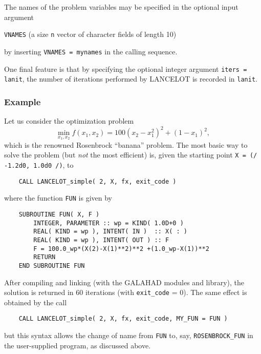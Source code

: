 \documentclass{article}
\begin{document}
The names of the problem variables may be specified in the optional
input argument
\begin{description}
\item[{\tt VNAMES} (a size {\tt n} vector of character fields of
length 10)]\mbox{}
\end{description}
by inserting {\tt VNAMES = mynames} in the calling sequence.

One final feature is that by specifying the optional integer
argument {\tt iters = lanit}, the number of iterations performed
by {\sf LANCELOT} is recorded in {\tt lanit}.

\subsubsection*{Example}

Let us consider the optimization problem
\[
\min_{x_1,x_2 } f( x_1, x_2 ) = 100 ( x_2 - x_1^2 )^2 + ( 1 - x_1 )^2,
\]
which is the renowned Rosenbrock ``banana'' problem.
The most basic way to solve the problem (but \emph{not} the most efficient)
is, given the starting point {\tt X = (/ -1.2d0, 1.0d0 /)}, to
\begin{lstlisting}
    CALL LANCELOT_simple( 2, X, fx, exit_code )
\end{lstlisting}
\noindent
where the function {\tt FUN} is given by
\begin{lstlisting}
    SUBROUTINE FUN( X, F )
        INTEGER, PARAMETER :: wp = KIND( 1.0D+0 )
        REAL( KIND = wp ), INTENT( IN )  :: X( : )
        REAL( KIND = wp ), INTENT( OUT ) :: F
        F = 100.0_wp*(X(2)-X(1)**2)**2 +(1.0_wp-X(1))**2
        RETURN
    END SUBROUTINE FUN
\end{lstlisting}
\noindent
After compiling and linking (with the {\sf GALAHAD} modules and library),
the solution is returned in 60 iterations (with {\tt exit\_code} = 0).
The same effect is obtained by the call
\begin{lstlisting}
    CALL LANCELOT_simple( 2, X, fx, exit_code, MY_FUN = FUN )
\end{lstlisting}
\noindent
but this syntax allows the change of name from {\tt FUN} to, say,
{\tt ROSENBROCK\_FUN} in the user-supplied program, as discussed above.
\end{document}
